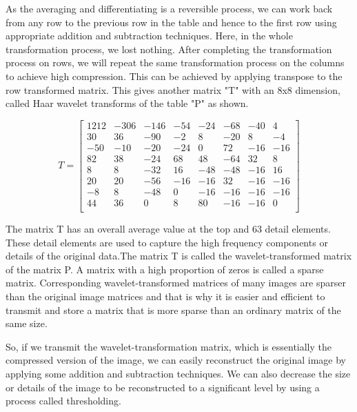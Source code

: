 \documentclass{article}
\begin{document}
\setlength{\parindent}{1cm}
As the averaging and differentiating is a reversible process, we can work back from any row to the previous row in the table and hence to the first row using appropriate addition and subtraction techniques. Here, in the whole transformation process, we lost nothing. After completing the transformation process on rows, we will repeat the same transformation process on the columns to achieve high compression. This can be achieved by applying transpose to the row transformed matrix. This gives another matrix "T" with an 8x8 dimension, called Haar wavelet transforms of the table "P" as shown. 

\begin{equation*}
T = \begin{bmatrix}
    1212 & -306 & -146 & -54 & -24 & -68 & -40 & 4 \\
    30 & 36 & -90 & -2 & 8 & -20 & 8 & -4 \\
    -50 & -10 & -20 & -24 & 0 & 72 & -16 & -16 \\
    82 & 38 & -24 & 68 & 48 & -64 & 32 & 8 \\
    8 & 8 & -32 & 16 & -48 & -48 & -16 & 16 \\
    20 & 20 & -56 & -16 & -16 & 32 & -16 & -16 \\
    -8 & 8 & -48 & 0 & -16 & -16 & -16 & -16 \\
    44 & 36 & 0 & 8 & 80 & -16 & -16 & 0 \\
\end{bmatrix}
\end{equation*}

\setlength{\parindent}{1cm}
The matrix T has an overall average value at the top and 63 detail elements. These detail elements are used to capture the high frequency components or details of the original data.The matrix T is called the wavelet-transformed matrix of the matrix P. A matrix with a high proportion of zeros is called a sparse matrix. Corresponding wavelet-transformed matrices of many images are sparser than the original image matrices and that is why it is easier and efficient to transmit and store a matrix that is more sparse than an ordinary matrix of the same size. 

\setlength{\parindent}{1cm}
So, if we transmit the wavelet-transformation matrix, which is essentially the compressed version of the image, we can easily reconstruct the original image by applying some addition and subtraction techniques. We can also decrease the size or details of the image to be reconstructed to a significant level by using a process called thresholding.
\end{document}
